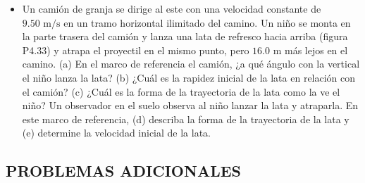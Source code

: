 \documentclass[11pt,a4paper]{article}
\begin{document}
\begin{itemize}
    \item[\textbf{33.}] Un camión de granja se dirige al este con una velocidad constante de $9.50 \text{ m/s}$ en un tramo horizontal ilimitado del camino. Un niño se monta en la parte trasera del camión y lanza una lata de refresco hacia arriba (figura P4.33) y atrapa el proyectil en el mismo punto, pero $16.0 \text{ m}$ más lejos en el camino. (a) En el marco de referencia el camión, ¿a qué ángulo con la vertical el niño lanza la lata? (b) ¿Cuál es la rapidez inicial de la lata en relación con el camión? (c) ¿Cuál es la forma de la trayectoria de la lata como la ve el niño? Un observador en el suelo observa al niño lanzar la lata y atraparla. En este marco de referencia, (d) describa la forma de la trayectoria de la lata y (e) determine la velocidad inicial de la lata.
    \vspace*{9cm}
\end{itemize}

\newpage

\subsection*{PROBLEMAS ADICIONALES}
\end{document}
